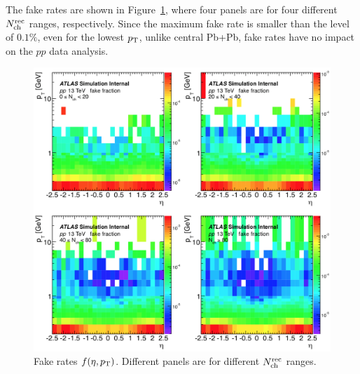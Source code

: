 The fake rates are shown in Figure~\ref{fig:detector_ATLAS_track_fake_pp13}, where four panels are for four different $N_\text{ch}^\text{rec}$ ranges, respectively. Since the maximum fake rate is smaller than the level of $0.1\%$, even for the lowest $p_\text{T}$, unlike central Pb+Pb, fake rates have no impact on the $pp$ data analysis.
\begin{figure}[H]
\centering
\includegraphics[width=.95\linewidth]{figs/chapter_detector/ATLAS_track_fake_pp13.png}
\caption{Fake rates $f(\eta, p_\text{T})$. Different panels are for different $N_\text{ch}^\text{rec}$ ranges.}
\label{fig:detector_ATLAS_track_fake_pp13}
\end{figure}



